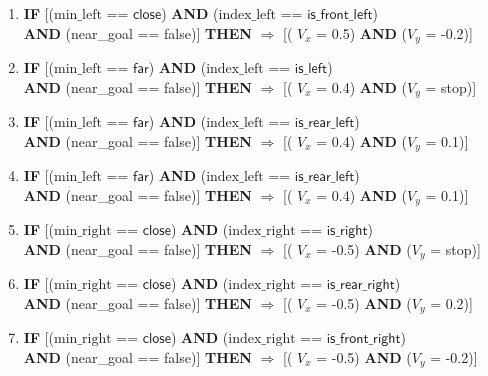 \begin{enumerate}
	\item \textbf{IF} [($\text{min\_left}$ == $\textsf{close}$) \textbf{AND} ($\text{index\_left}$ == $\textsf{is\_front\_left}$)\\
	\textbf{AND} (near\_goal == \textsf{false})]
	\textbf{THEN} $\Rightarrow$ [( $V_x$ = \textsf{0.5}) \textbf{AND} ($V_y$ = \textsf{-0.2})]
	
	\item \textbf{IF} [($\text{min\_left}$ == $\textsf{far}$) \textbf{AND} ($\text{index\_left}$ == $\textsf{is\_left}$)\\
	\textbf{AND} (near\_goal == \textsf{false})]
	\textbf{THEN} $\Rightarrow$ [( $V_x$ = \textsf{0.4}) \textbf{AND} ($V_y$ = \textsf{stop})]
	
	\item \textbf{IF} [($\text{min\_left}$ == $\textsf{far}$) \textbf{AND} ($\text{index\_left}$ == $\textsf{is\_rear\_left}$)\\
	\textbf{AND} (near\_goal == \textsf{false})]
	\textbf{THEN} $\Rightarrow$ [( $V_x$ = \textsf{0.4}) \textbf{AND} ($V_y$ = \textsf{0.1})]
	
	\item \textbf{IF} [($\text{min\_left}$ == $\textsf{far}$) \textbf{AND} ($\text{index\_left}$ == $\textsf{is\_rear\_left}$)\\
	\textbf{AND} (near\_goal == \textsf{false})]
	\textbf{THEN} $\Rightarrow$ [( $V_x$ = \textsf{0.4}) \textbf{AND} ($V_y$ = \textsf{0.1})]
	
	\item \textbf{IF} [($\text{min\_right}$ == $\textsf{close}$) \textbf{AND} ($\text{index\_right}$ == $\textsf{is\_right}$)\\
	\textbf{AND} (near\_goal == \textsf{false})]
	\textbf{THEN} $\Rightarrow$ [( $V_x$ = \textsf{-0.5}) \textbf{AND} ($V_y$ = \textsf{stop})]
	
	\item \textbf{IF} [($\text{min\_right}$ == $\textsf{close}$) \textbf{AND} ($\text{index\_right}$ == $\textsf{is\_rear\_right}$)\\
	\textbf{AND} (near\_goal == \textsf{false})]
	\textbf{THEN} $\Rightarrow$ [( $V_x$ = \textsf{-0.5}) \textbf{AND} ($V_y$ = \textsf{0.2})]
	
	\item \textbf{IF} [($\text{min\_right}$ == $\textsf{close}$) \textbf{AND} ($\text{index\_right}$ == $\textsf{is\_front\_right}$)\\
	\textbf{AND} (near\_goal == \textsf{false})]
	\textbf{THEN} $\Rightarrow$ [( $V_x$ = \textsf{-0.5}) \textbf{AND} ($V_y$ = \textsf{-0.2})]
	

\end{enumerate}
